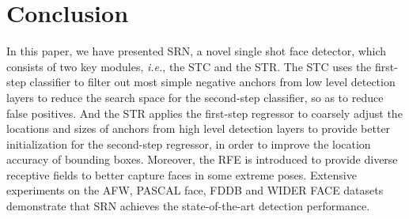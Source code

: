 \documentclass[letterpaper]{article} \usepackage{aaai19m}  \usepackage{times}  \usepackage{helvet}  \usepackage{courier}  \usepackage{url}  \usepackage{graphicx}  \usepackage{subfigure}
\def\ie{{\em i.e.}}
\begin{document}
\section{Conclusion}
In this paper, we have presented SRN, a novel single shot face detector, which consists of two key modules, \ie, the STC and the STR. The STC uses the first-step classifier to filter out most simple negative anchors from low level detection layers to reduce the search space for the second-step classifier, so as to reduce false positives. And the STR applies the first-step regressor to coarsely adjust the locations and sizes of anchors from high level detection layers to provide better initialization for the second-step regressor, in order to improve the location accuracy of bounding boxes. Moreover, the RFE is introduced to provide diverse receptive fields to better capture faces in some extreme poses. Extensive experiments on the AFW, PASCAL face, FDDB and WIDER FACE datasets demonstrate that SRN achieves the state-of-the-art detection performance.

\clearpage
\small


\end{document}

